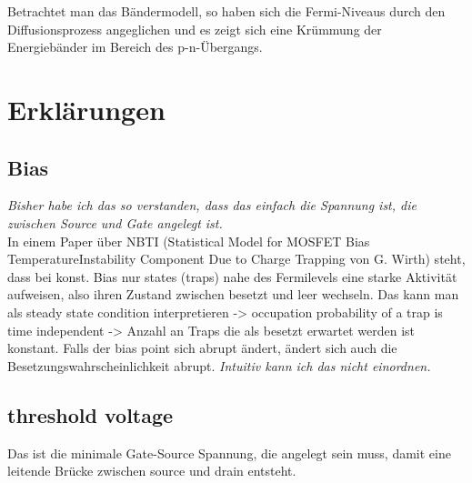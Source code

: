 \documentclass[paper=a4,10pt]{scrartcl}
\begin{document}
Betrachtet man das Bändermodell, so haben sich die Fermi-Niveaus durch den Diffusionsprozess angeglichen und es zeigt sich eine Krümmung der Energiebänder im Bereich des p-n-Übergangs.




\section{Erklärungen}
\subsection{Bias}
\textit{Bisher habe ich das so verstanden, dass das einfach die Spannung ist, die zwischen Source und Gate angelegt ist.} \\

\noindent
In einem Paper über NBTI (Statistical Model for MOSFET Bias TemperatureInstability Component Due to Charge Trapping von G. Wirth) steht, dass bei konst. Bias nur states (traps) nahe des Fermilevels eine starke Aktivität aufweisen, also ihren Zustand zwischen besetzt und leer wechseln. Das kann man als steady state condition interpretieren -> occupation probability of a trap is time independent -> Anzahl an Traps die als besetzt erwartet werden ist konstant. Falls der bias point sich abrupt ändert, ändert sich auch die Besetzungswahrscheinlichkeit abrupt.
\textit{Intuitiv kann ich das nicht einordnen.}

\subsection{threshold voltage}
Das ist die minimale Gate-Source Spannung, die angelegt sein muss, damit eine leitende Brücke zwischen source und drain entsteht.
\end{document}

